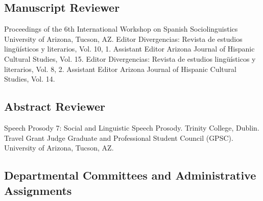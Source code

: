 \documentclass[11pt,letterpaper]{assets/tex/moderncv}
\begin{document}
\subsection{Manuscript Reviewer}

        {Proceedings of the 6th International Workshop on Spanish Sociolinguistics}
        {}
        {}
        {}
        {University of Arizona, Tucson, AZ.}
        {Editor}
        {Divergencias: Revista de estudios ling\"u\'isticos y literarios, Vol. 10, 1.}
        {}
        {}
        {}
        {Assistant Editor}
        {Arizona Journal of Hispanic Cultural Studies, Vol. 15.}
        {}
        {}
        {}
        {Editor}
        {Divergencias: Revista de estudios ling\"u\'isticos y literarios, Vol. 8, 2.}
        {}
        {}
        {}
        {Assistant Editor}
        {Arizona Journal of Hispanic Cultural Studies, Vol. 14.}
        {}
        {}
        {}

\subsection{Abstract Reviewer}

        {Speech Prosody 7: Social and Linguistic Speech Prosody.}
        {}
        {}
        {}
        {Trinity College, Dublin.}
        {Travel Grant Judge}
        {Graduate and Professional Student Council (GPSC).}
        {}
        {}
        {University of Arizona, Tucson, AZ.}

\subsection{Departmental Committees and Administrative Assignments}
\end{document}

